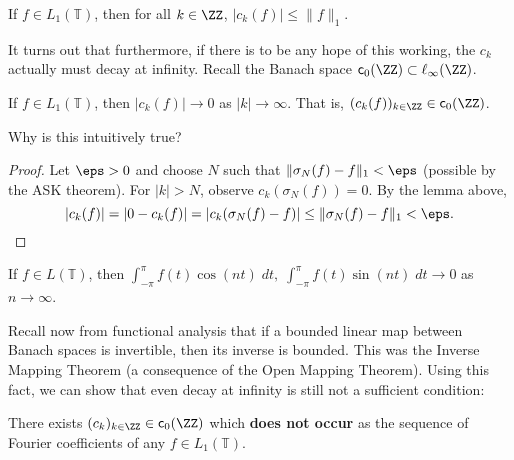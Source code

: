 \begin{lemma}
If $f \in L_1(\mathbb{T})$, then for all $k \in \ZZ$, $|c_k(f)| \leq \| f \|_1$.
\end{lemma}


It turns out that furthermore, if there is to be any hope of this working, the $c_k$ actually must decay at infinity. Recall the Banach space $\mathsf{c}_0(\ZZ) \subset \ell_\infty(\ZZ)$.

\begin{theorem}
If $f \in L_1(\mathbb{T})$, then $|c_k(f)| \to 0$ as $|k| \to \infty$. That is, $(c_k(f))_{k \in \ZZ} \in \mathsf{c}_0(\ZZ)$.
\end{theorem}

\begin{moral}
Why is this intuitively true?
\end{moral}

\begin{proof}
Let $\eps > 0$ and choose $N$ such that $\| \sigma_{N}(f) - f \|_1 < \eps$ (possible by the ASK theorem). For $|k| > N$, observe $c_k(\sigma_{N}(f))=0$. By the lemma above,
\[ |c_k(f)| = |0 - c_k(f)| = |c_k(\sigma_{N}(f) - f)| \leq \| \sigma_{N}(f) - f \|_1 < \eps. \qedhere \]
\end{proof}

\begin{corollary}
If $f \in L(\mathbb{T})$, then $\int_{-\pi}^\pi f(t) \cos(nt) \; dt, \; \int_{-\pi}^\pi f(t) \sin(nt) \; dt \to 0$ as $n \to \infty$.
\end{corollary}

Recall now from functional analysis that if a bounded linear map between Banach spaces is invertible, then its inverse is bounded. This was the Inverse Mapping Theorem (a consequence of the Open Mapping Theorem). Using this fact, we can show that even decay at infinity is still not a sufficient condition:

\begin{corollary}
There exists $(c_k)_{k \in \ZZ} \in \mathsf{c}_0(\ZZ)$ which \textbf{does not occur} as the sequence of Fourier coefficients of any $f \in L_1(\mathbb{T})$.
\end{corollary}


